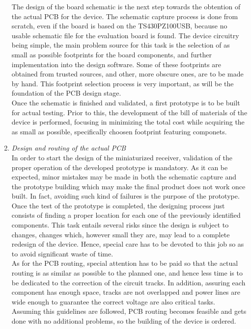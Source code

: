 \begin{enumerate}
				The design of the board schematic is the next step towards the obtention of the actual PCB for the device. The schematic capture process is done from scratch, even if the board is based on the TS430PZ100USB, because no usable schematic file for the evaluation board is found. The device circuitry being simple, the main problem source for this task is the selection of as small as possible footprints for the board components, and further implementation into the design software. Some of these footprints are obtained from trusted sources, and other, more obscure ones, are to be made by hand. This footprint selection process is very important, as will be the foundation of the PCB design stage.\\

				Once the schematic is finished and validated, a first prototype is to be built for actual testing. Prior to this, the development of the bill of materials of the device is performed, focusing in minimizing the total cost while acquiring the as small as possible, specifically choosen footprint featuring componets.

			\item \emph{Design and routing of the actual PCB}\\
				In order to start the design of the miniaturized receiver, validation of the proper operation of the
				developed prototype is mandatory. As it can be expected, minor mistakes may be made in both the schematic
				capture and the prototype building which may make the final product does not work once built. In fact,
				avoiding such kind of failures is the purpose of the prototype.\\

				Once the test of the prototype is completed, the designing process just consists of finding a proper
				location for each one of the previously identified components. This task entails several risks since
				the design is subject to changes, changes which, however small they are, may lead to a complete
				redesign of the device. Hence, special care has to be devoted to this job so as to avoid significant
				waste of time.\\

				As for the PCB routing, special attention has to be paid so that the actual routing is as similar
				as possible to the planned one, and hence less time is to be dedicated to the correction of the circuit 
				tracks. In addition, assuring each component has enough space, tracks are not overlapped and power
				lines are wide enough to guarantee the correct voltage are also critical tasks.\\

				Assuming this guidelines are followed, PCB routing becomes feasible and gets done with no
				additional problems, so the building of the device is ordered.\\

			\end{enumerate}


